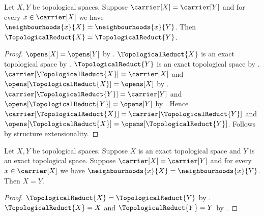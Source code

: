 \begin{corollary}\label{equal_neighbourhood_filters_determine_topological_reduct}
    Let $X,Y$ be topological spaces.
    Suppose $\carrier[X]=\carrier[Y]$ and
        for every $x\in\carrier[X]$ we have
        $\neighbourhoods{x}{X}=\neighbourhoods{x}{Y}$.
    Then $\TopologicalReduct{X}=\TopologicalReduct{Y}$.
\end{corollary}
\begin{proof}
    $\opens[X]=\opens[Y]$ by
        .
    $\TopologicalReduct{X}$ is an exact topological space by
        .
    $\TopologicalReduct{Y}$ is an exact topological space by
        .
    $\carrier[\TopologicalReduct{X}]=\carrier[X]$ and
        $\opens[\TopologicalReduct{X}]=\opens[X]$ by
        .
    $\carrier[\TopologicalReduct{Y}]=\carrier[Y]$ and
        $\opens[\TopologicalReduct{Y}]=\opens[Y]$ by
        .
    Hence
        $\carrier[\TopologicalReduct{X}]
            =\carrier[\TopologicalReduct{Y}]$ and
        $\opens[\TopologicalReduct{X}]
            =\opens[\TopologicalReduct{Y}]$.
    Follows by structure extensionality.
\end{proof}

\begin{corollary}\label{equal_neighbourhood_filters_determine_exact_spaces}
    Let $X,Y$ be topological spaces.
    Suppose $X$ is an exact topological space and
        $Y$ is an exact topological space.
    Suppose $\carrier[X]=\carrier[Y]$ and
        for every $x\in\carrier[X]$ we have
        $\neighbourhoods{x}{X}=\neighbourhoods{x}{Y}$.
    Then $X=Y$.
\end{corollary}
\begin{proof}
    $\TopologicalReduct{X}=\TopologicalReduct{Y}$ by
        .
    $\TopologicalReduct{X}=X$ and $\TopologicalReduct{Y}=Y$ by
        .
\end{proof}
